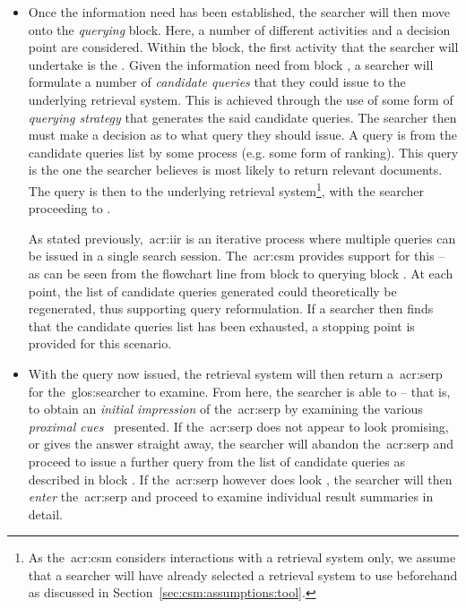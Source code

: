 \vspace*{-4mm}
\begin{itemize}
    \item[\blueboxbold{B}]{ Once the information need has been established, the searcher will then move onto the \emph{querying} block. Here, a number of different activities and a decision point are considered. Within the block, the first activity that the searcher will undertake is the . Given the information need from block , a searcher will formulate a number of \emph{candidate queries} that they could issue to the underlying retrieval system. This is achieved through the use of some form of \emph{querying strategy} that generates the said candidate queries. The searcher then must make a decision as to what query they should issue. A query is  from the candidate queries list by some process (e.g. some form of ranking). This query is the one the searcher believes is most likely to return relevant documents. The query is then  to the underlying retrieval system\footnote{As the~\gls{acr:csm} considers interactions with a retrieval system only, we assume that a searcher will have already selected a retrieval system to use beforehand as discussed in Section~\ref{sec:csm:assumptions:tool}.}, with the searcher proceeding to .
    
    As stated previously,~\gls{acr:iir} is an iterative process where multiple queries can be issued in a single search session. The~\gls{acr:csm} provides support for this -- as can be seen from the flowchart line from block  to querying block . At each point, the list of candidate queries generated could theoretically be regenerated, thus supporting query reformulation. If a searcher then finds that the candidate queries list has been exhausted, a stopping point is provided for this scenario.}
        
    \item[\blueboxbold{C}]{ With the query now issued, the retrieval system will then return a~\gls{acr:serp} for the~\gls{glos:searcher} to examine. From here, the searcher is able to  -- that is, to obtain an \emph{initial impression} of the~\gls{acr:serp} by examining the various \emph{proximal cues}~\citep{chi2001information_scent} presented. If the~\gls{acr:serp} does not appear to look promising, or gives the answer straight away, the searcher will abandon the~\gls{acr:serp} and proceed to issue a further query from the list of candidate queries as described in block . If the~\gls{acr:serp} however does look , the searcher will then \emph{enter} the~\gls{acr:serp} and proceed to examine individual result summaries in detail.}
    

\end{itemize}
